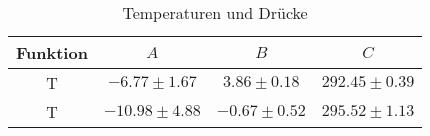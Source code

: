 \begin{table} 
 \centering 
 \begin{tabular}{S S S S } 
 \toprule  
{Funktion} & {$A$} & {$B$} & {$C$} \\ 
\midrule  
 T & $\num{-6.77} \pm {1.67}$ & $\num{3.86}\pm {0.18}$ & $\num{292.45} \pm {0.39}$ \\ 
T & $\num{-10.98}\pm {4.88}$ & $\num{-0.67}\pm {0.52}$ & $\num{295.52}\pm {1.13}$ \\ 
\bottomrule 
 \end{tabular} 
 \caption{Temperaturen und Drücke} 
 \label{tab: tempdruck} 
  \end{table}